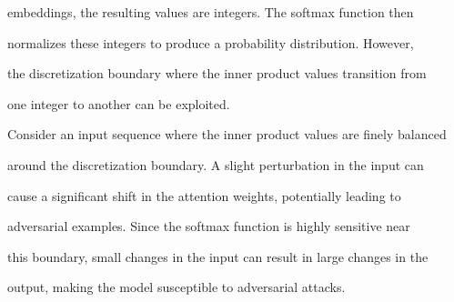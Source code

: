 \documentclass[11pt]{article}
\theoremstyle{definition}
\begin{document}
embeddings, the resulting values are integers. The softmax function then






normalizes these integers to produce a probability distribution. However,






the discretization boundary where the inner product values transition from






one integer to another can be exploited.













Consider an input sequence where the inner product values are finely balanced






around the discretization boundary. A slight perturbation in the input can






cause a significant shift in the attention weights, potentially leading to






adversarial examples. Since the softmax function is highly sensitive near






this boundary, small changes in the input can result in large changes in the






output, making the model susceptible to adversarial attacks.
\end{document}
